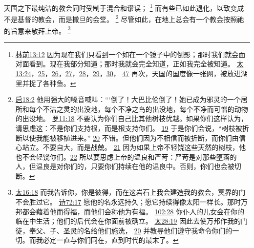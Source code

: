 \documentclass[12pt, a4paper, oneside]{ctexart}
\newcounter{parnum}[section]
\newcommand{\N}{%
   \noindent\refstepcounter{parnum}%
    \makebox[\parindent][l]{\textbf{\arabic{parnum}.}}}
\begin{document}
\N 天国之下最纯洁的教会同时受制于混合和谬误；
	\footnote {
		\href{https://biblehub.com/1_corinthians/13-12.htm}{林前13:12} 因为现在我们只看到一个如在一个镜子中的倒影；那时我们就会面对面看到。现在我部分知道；那时我就会完全知道，正如我完全被知道。
		\href{https://biblehub.com/matthew/13-24.htm}{太13:24}，\href{https://biblehub.com/matthew/13-25.htm}{25}，\href{https://biblehub.com/matthew/13-26.htm}{26}，\href{https://biblehub.com/matthew/13-27.htm}{27}，\href{https://biblehub.com/matthew/13-28.htm}{28}，\href{https://biblehub.com/matthew/13-29.htm}{29}，\href{https://biblehub.com/matthew/13-30.htm}{30}，
		\href{https://biblehub.com/matthew/13-47.htm}{47} 再次，天国的国度像一张网，被放进湖里并捉了各种鱼。
	}
	而有些已如此退化，以致变成不是基督的教会，而是撒旦的会堂。
	\footnote {
		\href{https://biblehub.com/revelation/18-2.htm}{启18:2} 他用强大的嗓音喊叫：“‘倒了！大巴比伦倒了！她已成为邪灵的一个居所和每个不洁之灵的出没地，每个不净之鸟的出没地，每个不净而可憎的动物的出没地。
		\href{https://biblehub.com/romans/11-18.htm}{罗11:18} 不要认为你们自己比其他树枝优越。如果你们这样认为，请思虑这：不是你们支持根，而是根支持你们。
		\href{https://biblehub.com/romans/11-19.htm}{19} 于是你们会说，“树枝被折断以使我能被移植进来。”
		\href{https://biblehub.com/romans/11-20.htm}{20} 不错。但他们因为不相信而被折断，而你们由信心站立。不要自大，而是战兢。
		\href{https://biblehub.com/romans/11-21.htm}{21} 因为如果上帝不轻饶这些天然的树枝，他也不会轻饶你们。\href{https://biblehub.com/romans/11-22.htm}{22} 所以要思虑上帝的温良和严苛：严苛是对那些堕落的人，但温良是对你们的，只要你们持续在他的温良中。否则，你们也会被切断。
	}
	尽管如此，在地上总会有一个教会按照祂的旨意来敬拜上帝。
	\footnote {
		\href{https://biblehub.com/matthew/16-18.htm}{太16:18} 而我告诉你，你是彼得，而在这岩石上我会建造我的教会，冥界的门不会胜过它。
		\href{https://biblehub.com/psalms/72-17.htm}{诗72:17} 愿他的名永远持久；愿它持续得像太阳一样长。那时万邦都会藉着他而得福，而他们会称他为有福。
		\href{https://biblehub.com/psalms/102-28.htm}{102:28} 你仆人的儿女会在你的临在中生活；他们的后代会在你面前被确立。
		\href{https://biblehub.com/matthew/28-19.htm}{太28:19} 因此去使万邦作我的门徒，奉父、子、圣灵的名给他们施洗，
		\href{https://biblehub.com/matthew/28-20.htm}{20} 并教导他们遵守我命令你们的一切。而我必定一直与你们同在，直到时代的最末了。
	}
\end{document}
